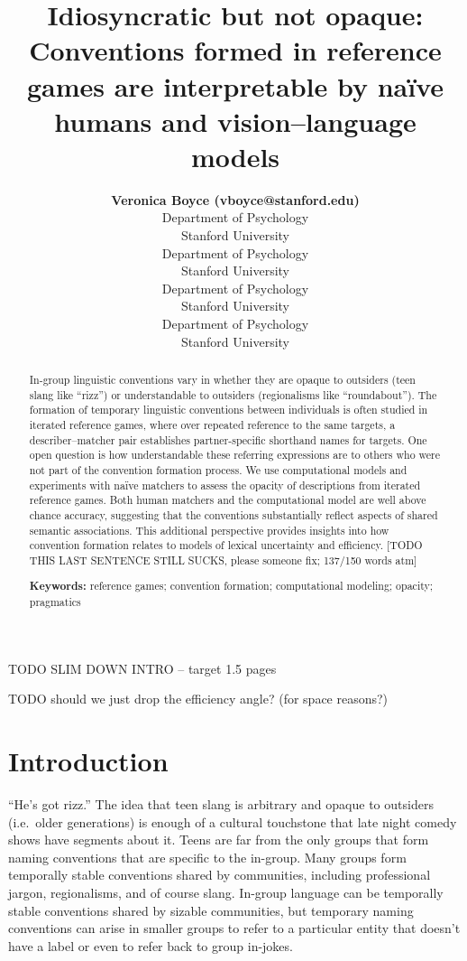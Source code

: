\documentclass[10pt, letterpaper]{article}
\title{Idiosyncratic but not opaque: Conventions formed in reference
games are interpretable by naïve humans and vision--language models}
\author{{\large \bf Veronica Boyce (vboyce@stanford.edu)} \\ Department of Psychology \\ Stanford University \And {\large \bf Ben Prystawski (benpry@stanford.edu)} \\Department of Psychology \\ Stanford University \AND {\large \bf Alvin Wei Ming Tan (tanawm@stanford.edu)} \\ Department of Psychology \\ Stanford University \And {\large \bf Michael C. Frank (mcfrank@stanford.edu)} \\ Department of Psychology \\ Stanford University}
\begin{document}
\maketitle

\begin{abstract}
In-group linguistic conventions vary in whether they are opaque to
outsiders (teen slang like ``rizz'') or understandable to outsiders
(regionalisms like ``roundabout''). The formation of temporary
linguistic conventions between individuals is often studied in iterated
reference games, where over repeated reference to the same targets, a
describer--matcher pair establishes partner-specific shorthand names for
targets. One open question is how understandable these referring
expressions are to others who were not part of the convention formation
process. We use computational models and experiments with naïve matchers
to assess the opacity of descriptions from iterated reference games.
Both human matchers and the computational model are well above chance
accuracy, suggesting that the conventions substantially reflect aspects
of shared semantic associations. This additional perspective provides
insights into how convention formation relates to models of lexical
uncertainty and efficiency. {[}TODO THIS LAST SENTENCE STILL SUCKS,
please someone fix; 137/150 words atm{]}

\textbf{Keywords:}
reference games; convention formation; computational modeling; opacity;
pragmatics
\end{abstract}

TODO SLIM DOWN INTRO -- target 1.5 pages

TODO should we just drop the efficiency angle? (for space reasons?)

\section{Introduction}\label{introduction}

``He's got rizz.'' The idea that teen slang is arbitrary and opaque to
outsiders (i.e.~older generations) is enough of a cultural touchstone
that late night comedy shows have segments about it. Teens are far from
the only groups that form naming conventions that are specific to the
in-group. Many groups form temporally stable conventions shared by
communities, including professional jargon, regionalisms, and of course
slang. In-group language can be temporally stable conventions shared by
sizable communities, but temporary naming conventions can arise in
smaller groups to refer to a particular entity that doesn't have a label
or even to refer back to group in-jokes.
\end{document}
